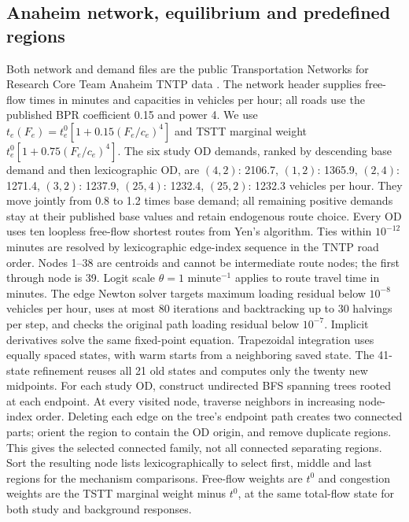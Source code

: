 \subsection{Anaheim network, equilibrium and predefined regions}\label{app:anaheimsettings}
Both network and demand files are the public Transportation Networks for Research Core Team Anaheim TNTP data \citep{tnfrc2024transportation}. The network header supplies free-flow times in minutes and capacities in vehicles per hour; all roads use the published BPR coefficient 0.15 and power 4. We use $t_e(F_e)=t_e^0[1+0.15(F_e/c_e)^4]$ and TSTT marginal weight $t_e^0[1+0.75(F_e/c_e)^4]$. The six study OD demands, ranked by descending base demand and then lexicographic OD, are $(4,2)$: 2106.7, $(1,2)$: 1365.9, $(2,4)$: 1271.4, $(3,2)$: 1237.9, $(25,4)$: 1232.4, $(25,2)$: 1232.3 vehicles per hour. They move jointly from 0.8 to 1.2 times base demand; all remaining positive demands stay at their published base values and retain endogenous route choice. Every OD uses ten loopless free-flow shortest routes from Yen's algorithm. Ties within $10^{-12}$ minutes are resolved by lexicographic edge-index sequence in the TNTP road order. Nodes 1--38 are centroids and cannot be intermediate route nodes; the first through node is 39. Logit scale $\theta=1$ minute$^{-1}$ applies to route travel time in minutes.
The edge Newton solver targets maximum loading residual below $10^{-8}$ vehicles per hour, uses at most 80 iterations and backtracking up to 30 halvings per step, and checks the original path loading residual below $10^{-7}$. Implicit derivatives solve the same fixed-point equation. Trapezoidal integration uses equally spaced states, with warm starts from a neighboring saved state. The 41-state refinement reuses all 21 old states and computes only the twenty new midpoints.
For each study OD, construct undirected BFS spanning trees rooted at each endpoint. At every visited node, traverse neighbors in increasing node-index order. Deleting each edge on the tree's endpoint path creates two connected parts; orient the region to contain the OD origin, and remove duplicate regions. This gives the selected connected family, not all connected separating regions. Sort the resulting node lists lexicographically to select first, middle and last regions for the mechanism comparisons. Free-flow weights are $t^0$ and congestion weights are the TSTT marginal weight minus $t^0$, at the same total-flow state for both study and background responses.
